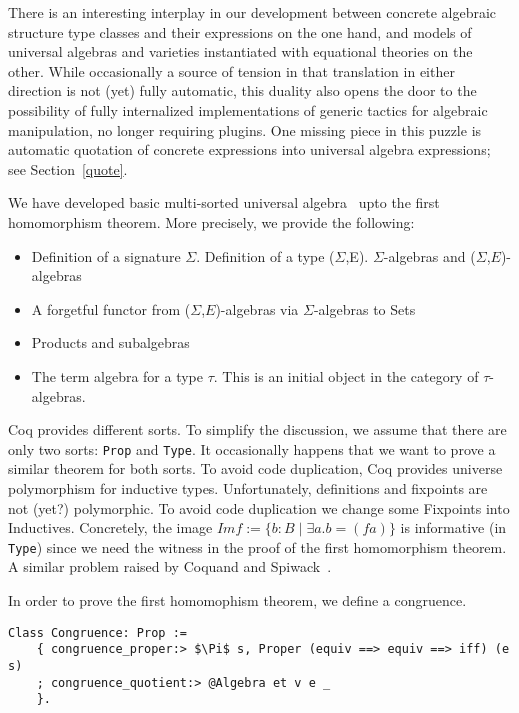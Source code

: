 \documentclass[a4paper,10pt,runningheads]{llncs}
\begin{document}
There is an interesting interplay in our development between concrete algebraic structure type classes and their expressions on the one hand, and models of universal algebras and varieties instantiated with equational theories on the other. While occasionally a source of tension in that translation in either direction is not (yet) fully automatic, this duality also opens the door to the possibility of fully internalized implementations of generic tactics for algebraic manipulation, no longer requiring plugins. One missing piece in this puzzle is automatic quotation of concrete expressions into universal algebra expressions; see Section~\ref{quote}.

We have developed basic multi-sorted universal algebra~\cite{meinke1993universal} upto the first
homomorphism theorem. More precisely, we provide the following:
\begin{itemize}
 \item Definition of a signature $\Sigma$. Definition of a type ($\Sigma$,E). $\Sigma$-algebras and
($\Sigma$,$E$)-algebras
 \item A forgetful functor from ($\Sigma$,$E$)-algebras via $\Sigma$-algebras to Sets
 \item Products and subalgebras
 \item The term algebra for a type $\tau$. This is an initial object in the category of
$\tau$-algebras.
\end{itemize}

Coq provides different sorts. To simplify the discussion, we assume that there are only two sorts:
\lstinline|Prop| and \lstinline|Type|. It occasionally happens that we want to prove a similar theorem for both sorts.
To avoid code duplication, Coq provides universe polymorphism for inductive types.
Unfortunately, definitions and fixpoints are not (yet?) polymorphic. To avoid code duplication we
change some Fixpoints into Inductives. 
Concretely, the image $Im f:=\{b:B \mid \exists a. b=(f a)\}$ is informative (in \lstinline|Type|) since we need the witness in the proof of the first homomorphism theorem. A similar problem raised by Coquand and Spiwack~\cite{coquand-towards}.

In order to prove the first homomophism theorem, we define a congruence.
\begin{lstlisting}
Class Congruence: Prop :=
    { congruence_proper:> $\Pi$ s, Proper (equiv ==> equiv ==> iff) (e s)
    ; congruence_quotient:> @Algebra et v e _
    }.
\end{lstlisting}
\end{document}
